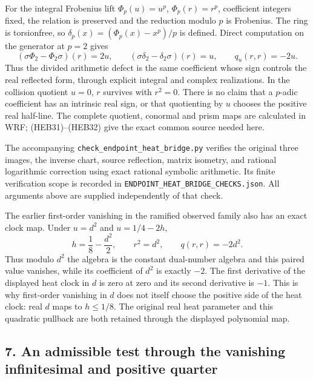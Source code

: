 \documentclass[
  10pt,
  a4paper,
]{article}
\begin{document}
For the integral Frobenius lift \(\Phi_p(u)=u^p\), \(\Phi_p(r)=r^p\),
coefficient integers fixed, the relation is preserved and the reduction
modulo \(p\) is Frobenius. The ring is torsionfree, so
\(\delta_p(x)=(\Phi_p(x)-x^p)/p\) is defined. Direct computation on the
generator at \(p=2\) gives \[
(\sigma\Phi_2-\Phi_2\sigma)(r)=2u,
\qquad(\sigma\delta_2-\delta_2\sigma)(r)=u,
\qquad q_u(r,r)=-2u.
\tag{HEB32}
\] Thus the divided arithmetic defect is the same coefficient whose sign
controls the real reflected form, through explicit integral and complex
realizations. In the collision quotient \(u=0\), \(r\) survives with
\(r^2=0\). There is no claim that a \(p\)-adic coefficient has an
intrinsic real sign, or that quotienting by \(u\) chooses the positive
real half-line. The complete quotient, conormal and prism maps are
calculated in WRF; (HEB31)--(HEB32) give the exact common source needed
here.

The accompanying \texttt{check\_\allowbreak{}endpoint\_\allowbreak{}heat\_\allowbreak{}bridge.\allowbreak{}py} verifies the
original three images, the inverse chart, source reflection, matrix
isometry, and rational logarithmic correction using exact rational
symbolic arithmetic. Its finite verification scope is recorded in
\texttt{ENDPOINT\_\allowbreak{}HEAT\_\allowbreak{}BRIDGE\_\allowbreak{}CHECKS.\allowbreak{}json}. All arguments above are
supplied independently of that check.

The earlier first-order vanishing in the ramified observed family also
has an exact clock map. Under \(u=d^2\) and \(u=1/4-2h\), \[
h=\frac18-\frac{d^2}{2},\qquad r^2=d^2,\qquad q(r,r)=-2d^2.
\tag{HEB32a}
\] Thus modulo \(d^2\) the algebra is the constant dual-number algebra
and this paired value vanishes, while its coefficient of \(d^2\) is
exactly \(-2\). The first derivative of the displayed heat clock in
\(d\) is zero at zero and its second derivative is \(-1\). This is why
first-order vanishing in \(d\) does not itself choose the positive side
of the heat clock: real \(d\) maps to \(h\le1/8\). The original real
heat parameter and this quadratic pullback are both retained through the
displayed polynomial map.

\subsection{7. An admissible test through the vanishing infinitesimal
and positive
quarter}\label{an-admissible-test-through-the-vanishing-infinitesimal-and-positive-quarter}
\end{document}
